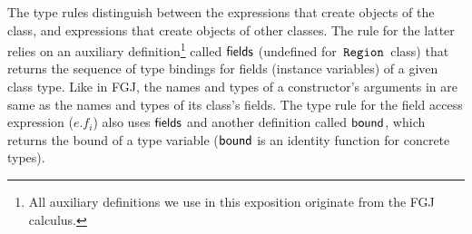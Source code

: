 

The type rules distinguish between the  expressions that create
objects of  the \RgnZ class, and  expressions that create
objects of other classes. The rule for the latter relies on an
auxiliary definition\footnote{All auxiliary definitions we use in this
exposition originate from the FGJ calculus.} called ${\sf fields}$
(undefined for $\,{\tt Region}\,$ class) that returns the sequence of type
bindings for fields (instance variables) of a given class type.  Like
in FGJ, the names and types of a constructor's arguments in \FB are
same as the names and types of its class's fields. The type rule for
the field access expression ($e.f_i$) also uses ${\sf fields}$ and another
definition called ${\sf bound}$, which returns the bound of a type variable
(${\sf bound}$ is an identity function for concrete types).

